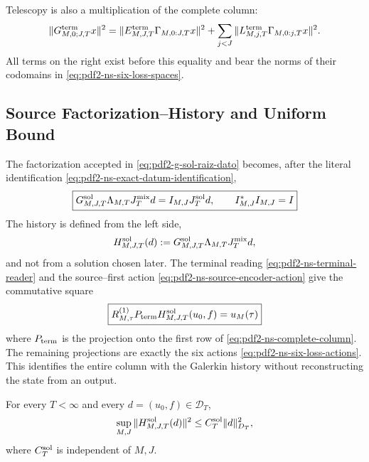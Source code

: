 Telescopy is also a multiplication of the complete column:
\begin{equation}\label{eq:pdf2-ns-global-column-isometry}
 \|\mathbf G_{M,0;J,T}^{\rm term}x\|^2
 =\|\mathcal E_{M,J,T}^{\rm term}\Gamma_{M,0:J,T}x\|^2
 +\sum_{j<J}\|L_{M,j,T}^{\rm term}
                  \Gamma_{M,0:j,T}x\|^2.
\end{equation}
All terms on the right exist before this equality and bear the
norms of their codomains in \eqref{eq:pdf2-ns-six-loss-spaces}.

\subsection{Source Factorization--History and Uniform Bound}

The factorization accepted in
\eqref{eq:pdf2-g-sol-raiz-dato} becomes, after the literal identification
\eqref{eq:pdf2-ns-exact-datum-identification},
\begin{equation}\label{eq:pdf2-ns-source-colligation}
 \boxed{\begin{gathered}
 \mathcal G_{M,J,T}^{\rm sol}\Lambda_{M,T}J_T^{\rm mix}d
 =I_{M,J}J_T^{\rm sol}d,
 \qquad I_{M,J}^*I_{M,J}=I
 \end{gathered}}
\end{equation}
The history is defined from the left side,
\begin{equation}\label{eq:pdf2-ns-root-factorization}
 \mathsf H_{M,J,T}^{\rm sol}(d):=
 \mathcal G_{M,J,T}^{\rm sol}\Lambda_{M,T}J_T^{\rm mix}d,
\end{equation}
and not from a solution chosen later. The terminal reading
\eqref{eq:pdf2-ns-terminal-reader} and the source--first action
\eqref{eq:pdf2-ns-source-encoder-action} give the commutative square
\begin{equation}\label{eq:pdf2-ns-data-history-commutation}
 \boxed{\begin{gathered}
 \mathcal R_{M,\tau}^{(1)}P_{\rm term}
 \mathsf H_{M,J,T}^{\rm sol}(u_0,f)=u_M(\tau)
 \end{gathered}}
\end{equation}
where $P_{\rm term}$ is the projection onto the first row of
\eqref{eq:pdf2-ns-complete-column}. The remaining projections are exactly the
six actions \eqref{eq:pdf2-ns-six-loss-actions}. This identifies the entire
column with the Galerkin history without reconstructing the state from an output.

\begin{theorem}
\label{thm:pdf2-ns-root-uniform}
For every $T<\infty$ and every $d=(u_0,f)\in\mathcal D_T$,
\begin{equation}\label{eq:pdf2-ns-root-bound}
 \sup_{M,J}\|\mathsf H_{M,J,T}^{\rm sol}(d)\|^2
 \le C_T^{\rm sol}\|d\|_{\mathcal D_T}^2,
\end{equation}
where $C_T^{\rm sol}$ is independent of $M,J$.
\end{theorem}

